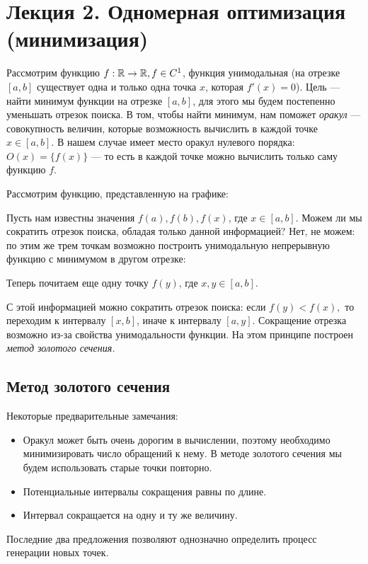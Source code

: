 \documentclass[a4paper, 12pt]{article}
\begin{document}

\section{Лекция 2. Одномерная оптимизация (минимизация)}

Рассмотрим функцию $f: \mathbb{R} \to \mathbb{R}, f \in C^1$, функция унимодальная (на отрезке $[a, b]$ существует одна и только одна точка $x$, которая $f'(x) = 0$). Цель --- найти минимум функции на отрезке $[a, b]$, для этого мы будем постепенно уменьшать отрезок поиска. В том, чтобы найти минимум, нам поможет \textit{оракул} --- совокупность величин, которые возможность вычислить в каждой точке $x \in [a, b]$. В нашем случае имеет место оракул нулевого порядка: $O(x) = \{f(x)\}$ --- то есть в каждой точке можно вычислить только саму функцию $f$. 

Рассмотрим функцию, представленную на графике: 


Пусть нам известны значения $f(a), f(b), f(x)$, где $x \in [a, b]$. Можем ли мы сократить отрезок поиска, обладая только данной информацией? Нет, не можем: по этим же трем точкам возможно построить унимодальную непрерывную функцию с минимумом в другом отрезке:


Теперь почитаем еще одну точку $f(y)$, где $x, y \in [a, b]$.


С этой информацией можно сократить отрезок поиска: если $f(y) < f(x),$ то переходим к интервалу $[x, b]$, иначе к интервалу $[a, y]$. Сокращение отрезка возможно из-за свойства унимодальности функции. На этом принципе построен \textit{метод золотого сечения.}

\subsection{Метод золотого сечения}
Некоторые предварительные замечания:
\begin{itemize}
    \item Оракул может быть очень дорогим в вычислении, поэтому необходимо минимизировать число обращений к нему. В методе золотого сечения мы будем использовать старые точки повторно.
    \item Потенциальные интервалы сокращения равны по длине.
    \item Интервал сокращается на одну и ту же величину.
\end{itemize}
Последние два предложения позволяют однозначно определить процесс генерации новых точек. 
\end{document}
